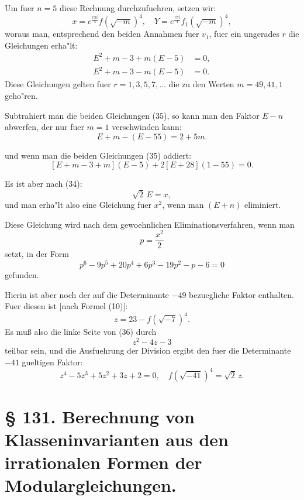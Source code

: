 \documentclass[12pt,a4paper]{article}
\theoremstyle{plain}
\theoremstyle{definition}
\theoremstyle{remark}
\begin{document}
Um fuer $n = 5$ diese Rechnung durchzufuehren, setzen wir:
\begin{equation}\label{eq:130_34}
x = e^{\frac{r\pi i}{4}} f(\sqrt{-m})^4, \quad Y = e^{\frac{r\pi i}{4}} f_1(\sqrt{-m})^4,
\end{equation}
woraus man, entsprechend den beiden Annahmen fuer $v_1$, fuer ein ungerades $r$ die Gleichungen erha"lt:
\begin{equation}\label{eq:130_35}
\begin{aligned}
E^2 + m - 3 + m(E - 5) &= 0, \\
E^2 + m - 3 - m(E - 5) &= 0.
\end{aligned}
\end{equation}
Diese Gleichungen gelten fuer $r = 1, 3, 5, 7, \ldots$ die zu den Werten $m = 49, 41, 1$ geho"ren.

Subtrahiert man die beiden Gleichungen (35), so kann man den Faktor $E - n$ abwerfen, der nur fuer $m = 1$ verschwinden kann:
\[
E + m - (E - 55) = 2 + 5m.
\]


und wenn man die beiden Gleichungen (35) addiert:
\[
[E + m - 3 + m](E - 5) + 2[E + 28](1 - 55) = 0.
\]

Es ist aber nach (34):
\[
\sqrt{2}\, E = x,
\]
und man erha"lt also eine Gleichung fuer $x^2$, wenn man $(E + n)$ eliminiert.

Diese Gleichung wird nach dem gewoehnlichen Eliminationsverfahren, wenn man
\[
p = \frac{x^2}{2}
\]
setzt, in der Form
\begin{equation}\label{eq:130_36}
p^6 - 9p^5 + 20p^4 + 6p^3 - 19p^2 - p - 6 = 0
\end{equation}
gefunden.

Hierin ist aber noch der auf die Determinante $-49$ bezuegliche Faktor enthalten. Fuer diesen ist [nach Formel (10)]:
\[
z = 23 - f(\sqrt{-7})^4.
\]
Es mu\ss{} also die linke Seite von (36) durch
\[
z^2 - 4z - 3
\]
teilbar sein, und die Ausfuehrung der Division ergibt den fuer die Determinante $-41$ gueltigen Faktor:
\begin{equation}\label{eq:130_37}
z^4 - 5z^3 + 5z^2 + 3z + 2 = 0, \quad f(\sqrt{-41})^4 = \sqrt{2}\, z.
\end{equation}

\newpage

\section*{\S{} 131. Berechnung von Klasseninvarianten aus den irrationalen Formen der Modulargleichungen.}
\end{document}

